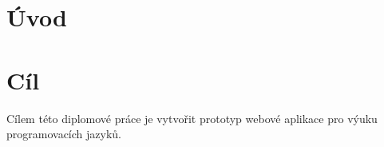 
\chapter{Úvod}


\chapter{Cíl}
Cílem této diplomové práce je vytvořit prototyp webové aplikace pro výuku programovacích jazyků.

